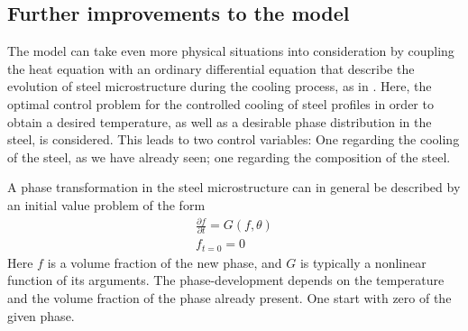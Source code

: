 
\subsection{Further improvements to the model}
The model can take even more physical situations into consideration by coupling the  heat equation with an ordinary differential equation that describe the evolution of steel microstructure during the cooling process, as in \cite{DPSteelOverview}. Here, the optimal control problem for the controlled cooling of steel profiles in order to obtain a desired temperature, as well as a desirable phase distribution in the steel, is considered. This leads to two control variables: One regarding the cooling of the steel, as we have already seen; one regarding the composition of the steel.

A phase transformation in the steel microstructure can in general be described by an initial value problem of the form 
\begin{align*}
    \frac{\partial f}{\partial t} = G(f,\theta ) \\
    f_{t=0} = 0
\end{align*}
Here $f$ is a volume fraction of the new phase, and $G$ is typically a nonlinear function of its arguments. The phase-development depends on the temperature and the volume fraction of the phase already present. One start with zero of the given phase. 

